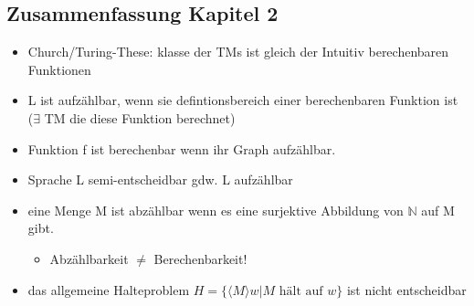 \documentclass[a4paper, 10pt]{article}
\theoremstyle{definition}
\newcommand{\goedl}[1]{\langle {#1}\rangle}
\begin{document}
\subsection{Zusammenfassung Kapitel 2}
\begin{itemize}
    \item Church/Turing-These: klasse der TMs ist gleich der Intuitiv berechenbaren Funktionen
    \item L ist aufzählbar, wenn sie defintionsbereich einer berechenbaren Funktion ist ($\exists$ TM die diese Funktion berechnet)
    \item Funktion f ist berechenbar wenn ihr Graph aufzählbar.
    \item Sprache L semi-entscheidbar gdw. L aufzählbar
    \item eine Menge M ist abzählbar wenn es eine surjektive Abbildung von $\mathbb{N}$ auf M gibt.\begin{itemize}
        \item Abzählbarkeit $\neq$ Berechenbarkeit!
    \end{itemize}
    \item das allgemeine Halteproblem $H=\{\goedl{M}w|M\text{ hält auf }w\}$ ist nicht entscheidbar
\end{itemize}
\end{document}
